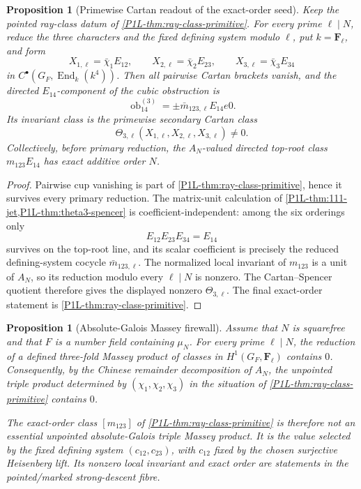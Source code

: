 \documentclass[11pt]{article}
\newtheorem{proposition}[theorem]{Proposition}
\theoremstyle{remark}
\newcommand{\F}{\mathbf F}
\providecommand{\End}{\operatorname{End}}
\begin{document}
\begin{proposition}[Primewise Cartan readout of the exact-order seed]
\label{P1L-prop:ray-class-cartan-readout}
Keep the pointed ray-class datum of \cref{P1L-thm:ray-class-primitive}.  For every
prime \(\ell\mid N\), reduce the three characters and the fixed defining
system modulo \(\ell\), put \(k=\F_\ell\), and form
\[
 X_{1,\ell}=\bar\chi_1E_{12},\qquad
 X_{2,\ell}=\bar\chi_2E_{23},\qquad
 X_{3,\ell}=\bar\chi_3E_{34}
\]
in \(C^\bullet(G_F,\End_k(k^4))\).  Then all pairwise Cartan brackets vanish,
and the directed \(E_{14}\)-component of the cubic obstruction is
\[
 \boxed{
 \operatorname{ob}^{(3)}_{14}
 =\pm\bar m_{123,\ell}E_{14}
e0.}
\]
Its invariant class is the primewise secondary Cartan class
\[
 \Theta_{3,\ell}(X_{1,\ell},X_{2,\ell},X_{3,\ell})\ne0.
\]
Collectively, before primary reduction, the \(A_N\)-valued directed top-root
class \(m_{123}E_{14}\) has exact additive order \(N\).
\end{proposition}

\begin{proof}
Pairwise cup vanishing is part of \cref{P1L-thm:ray-class-primitive}, hence it
survives every primary reduction.  The matrix-unit calculation of
\cref{P1L-thm:111-jet,P1L-thm:theta3-spencer} is coefficient-independent: among the
six orderings only
\[
 E_{12}E_{23}E_{34}=E_{14}
\]
survives on the top-root line, and its scalar coefficient is precisely the
reduced defining-system cocycle \(\bar m_{123,\ell}\).  The normalized local
invariant of \(m_{123}\) is a unit of \(A_N\), so its reduction modulo every
\(\ell\mid N\) is nonzero.  The Cartan--Spencer quotient therefore gives the
displayed nonzero \(\Theta_{3,\ell}\).  The final exact-order statement is
\cref{P1L-thm:ray-class-primitive}.
\end{proof}

\begin{proposition}[Absolute-Galois Massey firewall]\label{P1L-thm:absolute-massey-firewall}
Assume that $N$ is squarefree and that $F$ is a number field containing
$\mu_N$.  For every prime $\ell\mid N$, the reduction of a defined
three-fold Massey product of classes in
$H^1(G_F,\F_\ell)$ contains $0$.  Consequently, by the Chinese remainder
decomposition of $A_N$, the unpointed triple product determined by
$(\chi_1,\chi_2,\chi_3)$ in the situation of
\cref{P1L-thm:ray-class-primitive} contains $0$.

The exact-order class $[m_{123}]$ of
\cref{P1L-thm:ray-class-primitive} is therefore not an essential unpointed
absolute-Galois triple Massey product.  It is the value selected by the fixed
defining system $(c_{12},c_{23})$, with $c_{12}$ fixed by the chosen
surjective Heisenberg lift.  Its nonzero local invariant and exact order are
statements in the pointed/marked strong-descent fibre.
\end{proposition}
\end{document}
